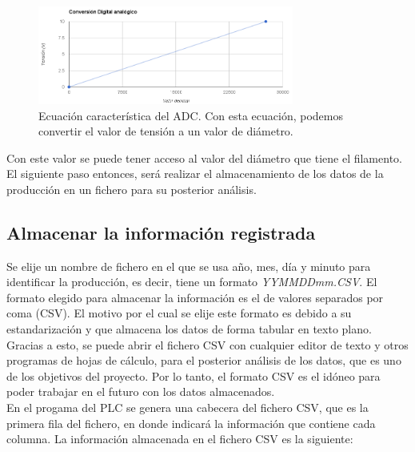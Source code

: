 \begin{figure}[H]
    \centering
    \includegraphics[width=0.75\textwidth]{images/PLC/image.png}
    \caption[Ecuación característica del ADC.]{Ecuación característica del ADC. Con esta ecuación, podemos convertir el valor de tensión a un valor de diámetro.} 
    \label{fig:plc_DAC}
\end{figure}

Con este valor se puede tener acceso al valor del diámetro que tiene el filamento. El siguiente paso entonces, será realizar el almacenamiento de los datos de la producción en un fichero para su posterior análisis.

\subsection{Almacenar la información registrada}
\label{sec:plc_SD}

Se elije un nombre de fichero en el que se usa año, mes, día y minuto para identificar la producción, es decir, tiene un formato \textit{YYMMDDmm.CSV}. El formato elegido para almacenar la información es el de valores separados por coma (CSV). El motivo por el cual se elije este formato es debido a su estandarización y que almacena los datos de forma tabular en texto plano. Gracias a esto, se puede abrir el fichero CSV con cualquier editor de texto y otros programas de hojas de cálculo, para el posterior análisis de los datos, que es uno de los objetivos del proyecto. Por lo tanto, el formato CSV es el idóneo para poder trabajar en el futuro con los datos almacenados.\\

En el progama del PLC se genera una cabecera del fichero CSV, que es la primera fila del fichero, en donde indicará la información que contiene cada columna. La información almacenada en el fichero CSV es la siguiente:

